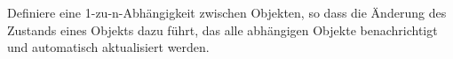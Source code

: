 \glqq Definiere eine 1-zu-n-Abhängigkeit zwischen Objekten, so dass die Änderung des Zustands eines Objekts dazu führt, das alle abhängigen Objekte benachrichtigt und automatisch aktualisiert werden. \grqq 
